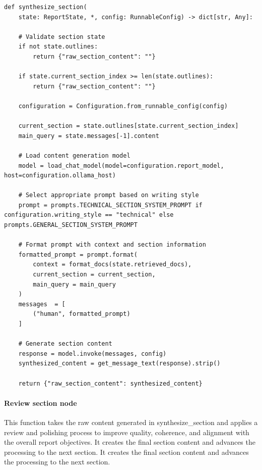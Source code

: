 \documentclass[11pt,a4paper]{report}
\begin{document}
\begin{lstlisting}[caption={Synthesize section node}]
def synthesize_section(
    state: ReportState, *, config: RunnableConfig) -> dict[str, Any]:

    # Validate section state
    if not state.outlines:
        return {"raw_section_content": ""}

    if state.current_section_index >= len(state.outlines):
        return {"raw_section_content": ""}
        
    configuration = Configuration.from_runnable_config(config)
    
    current_section = state.outlines[state.current_section_index]
    main_query = state.messages[-1].content

    # Load content generation model
    model = load_chat_model(model=configuration.report_model, host=configuration.ollama_host)

    # Select appropriate prompt based on writing style
    prompt = prompts.TECHNICAL_SECTION_SYSTEM_PROMPT if configuration.writing_style == "technical" else prompts.GENERAL_SECTION_SYSTEM_PROMPT
    
    # Format prompt with context and section information
    formatted_prompt = prompt.format(
        context = format_docs(state.retrieved_docs),
        current_section = current_section,
        main_query = main_query
    )
    messages  = [
        ("human", formatted_prompt)
    ]

    # Generate section content
    response = model.invoke(messages, config)
    synthesized_content = get_message_text(response).strip()

    return {"raw_section_content": synthesized_content}
\end{lstlisting}

\paragraph{Review section node}

This function takes the raw content generated in synthesize\_section and applies a review and polishing process to improve quality, coherence, and alignment with the overall report objectives. It creates the final section content and advances the processing to the next section. It creates the final section content and advances the processing to the next section.
\end{document}
